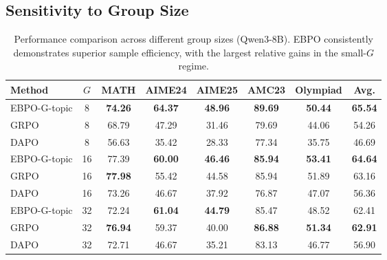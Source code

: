 \documentclass{article}
\theoremstyle{plain}
\theoremstyle{definition}
\theoremstyle{remark}
\newcommand{\oursG}{\textsc{EBPO-G}\xspace}
\begin{document}


\subsection{Sensitivity to Group Size}
\label{sec:group_size}

\begin{table}[t]
\centering
\begin{tabular}{lccccccc}
\toprule
\textbf{Method} & $G$ & \textbf{MATH} & \textbf{AIME24} & \textbf{AIME25} & \textbf{AMC23} & \textbf{Olympiad} & \textbf{Avg.} \\
\midrule
\oursG-topic & 8  & \textbf{74.26} & \textbf{64.37} & \textbf{48.96} & \textbf{89.69} & \textbf{50.44} & \textbf{65.54} \\
GRPO         & 8  & 68.79 & 47.29 & 31.46 & 79.69 & 44.06 & 54.26 \\
DAPO         & 8  & 56.63 & 35.42 & 28.33 & 77.34 & 35.75 & 46.69 \\
\midrule
\oursG-topic & 16 & 77.39 & \textbf{60.00} & \textbf{46.46} & \textbf{85.94} & \textbf{53.41} & \textbf{64.64} \\
GRPO         & 16 & \textbf{77.98} & 55.42 & 44.58 & 85.94 & 51.89 & 63.16 \\
DAPO         & 16 & 73.26 & 46.67 & 37.92 & 76.87 & 47.07 & 56.36 \\
\midrule
\oursG-topic & 32 & 72.24 & \textbf{61.04} & \textbf{44.79} & 85.47 & 48.52 & 62.41 \\
GRPO         & 32 & \textbf{76.94} & 59.37 & 40.00 & \textbf{86.88} & \textbf{51.34} & \textbf{62.91} \\
DAPO         & 32 & 72.71 & 46.67 & 35.21 & 83.13 & 46.77 & 56.90 \\
\bottomrule
\end{tabular}
\caption{Performance comparison across different group sizes (Qwen3-8B). EBPO consistently demonstrates superior sample efficiency, with the largest relative gains in the small-$G$ regime.}
\label{tab:group_size_results}
\end{table}
\end{document}
